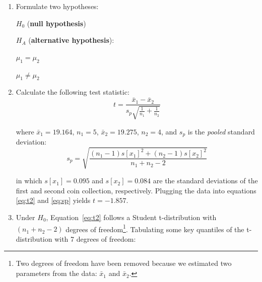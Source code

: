 \begin{enumerate}
\item  Formulate two hypotheses:\medskip

  \noindent\begin{minipage}{.4\textwidth}
    $H_0$ (\textbf{null hypothesis})
    
    \vspace{1em}
    
    $H_{\!A}$ (\textbf{alternative hypothesis}):
  \end{minipage}
  \begin{minipage}{.2\textwidth}
  \end{minipage}
  \begin{minipage}{.2\textwidth}
    $\mu_1=\mu_2$
    
    \vspace{1em}
    
    $\mu_1\neq{\mu_2}$
  \end{minipage}
  \begin{minipage}{.2\textwidth}
  \end{minipage}
  
\item Calculate the following test statistic:
  \begin{equation}
    t = \frac{\bar{x}_1 - \bar{x}_2}{s_p\sqrt{\frac{1}{n_1}+\frac{1}{n_2}}}
    \label{eq:t2}
  \end{equation}

  \noindent where $\bar{x}_1 = 19.164$, $n_1 = 5$, $\bar{x}_2 =
  19.275$, $n_2 = 4$, and $s_p$ is the \emph{pooled} standard
  deviation:
  \begin{equation}
    s_p = \sqrt{\frac{(n_1-1) s[x_1]^2 + (n_2-1) s[x_2]^2}{n_1 + n_2 - 2}}
    \label{eq:sp}
  \end{equation}

  \noindent in which $s[x_1]=0.095$ and $s[x_2]=0.084$ are the
  standard deviations of the first and second coin collection,
  respectively. Plugging the data into equations \ref{eq:t2} and
  \ref{eq:sp} yields $t=-1.857$.

\item Under $H_0$, Equation~\ref{eq:t2} follows a Student
  t-distribution with $(n_1+n_2-2)$ degrees of freedom\footnote{Two
    degrees of freedom have been removed because we estimated two
    parameters from the data: $\bar{x}_1$ and
    $\bar{x}_2$.}. Tabulating some key quantiles of the t-distribution
  with 7 degrees of freedom:


\end{enumerate}
